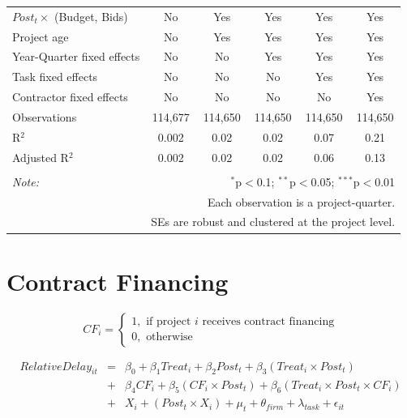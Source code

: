 \documentclass[
]{article}
\begin{document}
\begin{table}[H]
\begin{tabular}{@{\extracolsep{-2pt}}lccccc}
$Post_t \times$  (Budget, Bids) & No & Yes & Yes & Yes & Yes \\ 
Project age & No & Yes & Yes & Yes & Yes \\ 
Year-Quarter fixed effects & No & No & Yes & Yes & Yes \\ 
Task fixed effects & No & No & No & Yes & Yes \\ 
Contractor fixed effects & No & No & No & No & Yes \\ 
Observations & 114,677 & 114,650 & 114,650 & 114,650 & 114,650 \\ 
R$^{2}$ & 0.002 & 0.02 & 0.02 & 0.07 & 0.21 \\ 
Adjusted R$^{2}$ & 0.002 & 0.02 & 0.02 & 0.06 & 0.13 \\ 
\hline 
\hline \\[-1.8ex] 
\textit{Note:}  & \multicolumn{5}{r}{$^{*}$p$<$0.1; $^{**}$p$<$0.05; $^{***}$p$<$0.01} \\ 
 & \multicolumn{5}{r}{Each observation is a project-quarter.} \\ 
 & \multicolumn{5}{r}{SEs are robust and clustered at the project level.} \\ 
\end{tabular} 
\end{table}

\hypertarget{contract-financing}{%
\section{Contract Financing}\label{contract-financing}}

\[ CF_i = \begin{cases} 1, \text{ if project } i \text{ receives contract financing}\\
0, \text{ otherwise} \end{cases}\]

\[ \begin{aligned}
RelativeDelay_{it} &=& \beta_0+\beta_1 Treat_i + \beta_2 Post_t + \beta_3 (Treat_i \times Post_t) \\
&+&\beta_4 CF_i + \beta_5 (CF_i \times Post_t) + \beta_6 (Treat_i \times Post_t \times CF_i) \\ 
&+&X_i + (Post_t \times X_i) + \mu_t + \theta_{firm} + \lambda_{task}+ \epsilon_{it}
\end{aligned}\]
\end{document}
